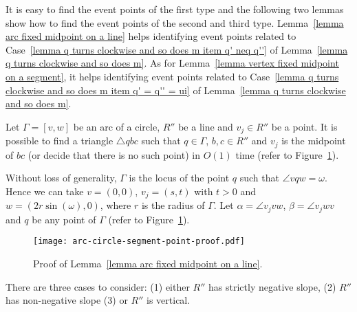 \documentclass[11pt, oneside]{article}
\begin{document}
It is easy to find the event points of the first type
and the following two lemmas
show how to find the event points 
of the second and third type.
Lemma~\ref{lemma arc fixed midpoint on a line}
helps identifying event points related
to Case~\ref{lemma q turns clockwise and so does m item q' neq q''}
of Lemma~\ref{lemma q turns clockwise and so does m}.
As for Lemma~\ref{lemma vertex fixed midpoint on a segment},
it helps identifying event points related
to Case~\ref{lemma q turns clockwise and so does m item q' = q'' = ui}
of Lemma~\ref{lemma q turns clockwise and so does m}.
\begin{lemma}
\label{lemma arc fixed midpoint on a line}
Let $\Gamma = [v,w]$ be an arc of a circle,
$R''$ be a line
and $v_j \in R''$ be a point.
It is possible to find a triangle $\triangle qbc$ 
such that $q \in \Gamma$,
$b,c\in R''$
and $v_j$ is the midpoint of $bc$
(or decide that there is no such point)
in $O(1)$ time
(refer to Figure~\ref{arc-circle-segment-point-proof}).
\end{lemma}

\proof
Without loss of generality,
$\Gamma$ is the locus of the point $q$
such that $\angle vqw = \omega$.
Hence we can take
$v=(0,0)$,
$v_j=(s,t)$ with $t > 0$
and $w=(2r\sin(\omega),0)$,
where $r$ is the radius of $\Gamma$.
Let $\alpha = \angle v_jvw$,
$\beta = \angle v_jwv$
and $q$ be any point of $\Gamma$
(refer to Figure~\ref{arc-circle-segment-point-proof}).
\begin{figure}
\centering
\texttt{[image: arc-circle-segment-point-proof.pdf]}
\caption{Proof of Lemma~\ref{lemma arc fixed midpoint on a line}.\label{arc-circle-segment-point-proof}}
\end{figure}
There are three cases to consider:
(1) either $R''$ has strictly negative slope,
(2) $R''$ has non-negative slope
(3) or $R''$ is vertical.
\end{document}
